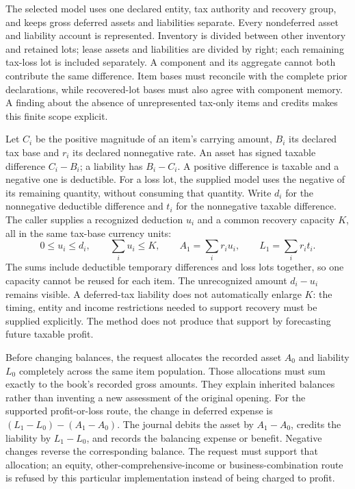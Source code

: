 The selected model uses one declared entity, tax authority and recovery group,
and keeps gross deferred assets and liabilities separate. Every nondeferred
asset and liability account is represented. Inventory is divided between other
inventory and retained lots; lease assets and liabilities are divided by right;
each remaining tax-loss lot is included separately. A component and its aggregate
cannot both contribute the same difference. Item bases must reconcile with the
complete prior declarations, while recovered-lot bases must also agree with
component memory. A finding about the absence of unrepresented tax-only items
and credits makes this finite scope explicit.

Let $C_i$ be the positive magnitude of an item's carrying amount, $B_i$ its
declared tax base and $r_i$ its declared nonnegative rate. An asset has signed
taxable difference $C_i-B_i$; a liability has $B_i-C_i$. A positive difference
is taxable and a negative one is deductible. For a loss lot, the supplied model
uses the negative of its remaining quantity, without consuming that quantity.
Write $d_i$ for the nonnegative deductible difference and $t_i$ for the
nonnegative taxable difference. The caller supplies a recognized deduction
$u_i$ and a common recovery capacity $K$, all in the same tax-base currency units:
\[
 0\leq u_i\leq d_i,\qquad \sum_i u_i\leq K,\qquad
 A_1=\sum_i r_i u_i,\qquad L_1=\sum_i r_i t_i.
\]
The sums include deductible temporary differences and loss lots together, so
one capacity cannot be reused for each item. The unrecognized amount $d_i-u_i$
remains visible. A deferred-tax liability does not automatically enlarge $K$:
the timing, entity and income restrictions needed to support recovery must be
supplied explicitly. The method does not produce that support by forecasting
future taxable profit.

Before changing balances, the request allocates the recorded asset $A_0$ and
liability $L_0$ completely across the same item population. Those allocations
must sum exactly to the book's recorded gross amounts. They explain inherited
balances rather than inventing a new assessment of the original opening.
For the supported profit-or-loss route, the change in deferred expense is
$(L_1-L_0)-(A_1-A_0)$. The journal debits the asset by $A_1-A_0$, credits the
liability by $L_1-L_0$, and records the balancing expense or benefit. Negative
changes reverse the corresponding balance. The request must support that
allocation; an equity, other-comprehensive-income or business-combination route
is refused by this particular implementation instead of being charged to profit.

